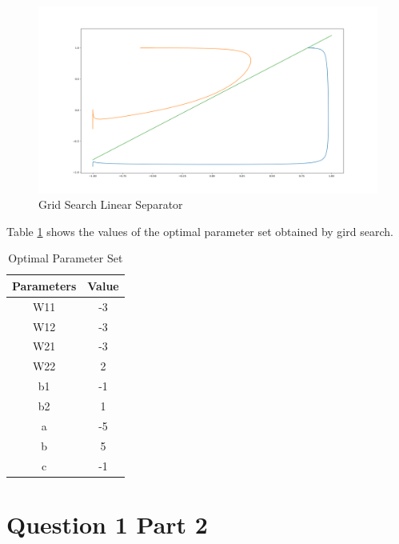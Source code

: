 \documentclass[12pt]{report}
\begin{document}
\begin{figure}[H]
	\begin{center}
		\includegraphics[scale=0.3]{que1b}
		\caption{Grid Search Linear Separator}
		\label{fig:3}
	\end{center}
\end{figure}


Table \ref{tbl:1} shows the values of the optimal parameter set obtained by gird search.

\begin{table}[H]
	\begin{center}
		\caption{Optimal Parameter Set}
		\begin{tabular}{|c|c|}
			\hline
			Parameters & Value \\ \hline
			W11        & -3    \\ \hline
			W12        & -3  \\ \hline
			W21        & -3    \\ \hline
			W22        &  2     \\ \hline
			b1         & -1    \\ \hline
			b2         &  1     \\ \hline
			a          &  -5    \\ \hline
			b          &  5     \\ \hline
			c          & -1    \\ \hline
		\end{tabular}
		
		\label{tbl:1}
	\end{center}
\end{table}

\section{Question 1 Part 2}
\end{document}
